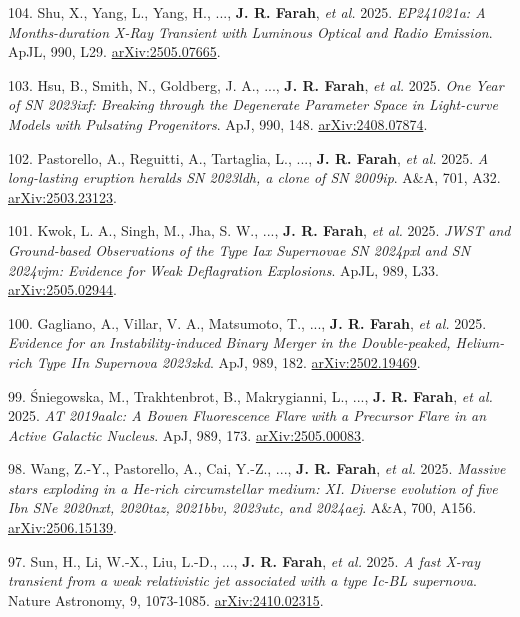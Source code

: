 \documentclass[margin,line]{res}
\newcommand{\apj}{ApJ}                    %
\newcommand{\apjl}{ApJL}                  %
\newcommand{\aap}{A\&A}                   %
\begin{document}
\begin{resume}
104. Shu, X., Yang, L., Yang, H., ..., \textbf{J. R. Farah}, \textit{et al.} 2025. \textit{EP241021a: A Months-duration X-Ray Transient with Luminous Optical and Radio Emission}. \apjl, 990, L29. \href{https://arxiv.org/abs/2505.07665}{arXiv:2505.07665}.

103. Hsu, B., Smith, N., Goldberg, J. A., ..., \textbf{J. R. Farah}, \textit{et al.} 2025. \textit{One Year of SN 2023ixf: Breaking through the Degenerate Parameter Space in Light-curve Models with Pulsating Progenitors}. \apj, 990, 148. \href{https://arxiv.org/abs/2408.07874}{arXiv:2408.07874}.

102. Pastorello, A., Reguitti, A., Tartaglia, L., ..., \textbf{J. R. Farah}, \textit{et al.} 2025. \textit{A long-lasting eruption heralds SN 2023ldh, a clone of SN 2009ip}. \aap, 701, A32. \href{https://arxiv.org/abs/2503.23123}{arXiv:2503.23123}.

101. Kwok, L. A., Singh, M., Jha, S. W., ..., \textbf{J. R. Farah}, \textit{et al.} 2025. \textit{JWST and Ground-based Observations of the Type Iax Supernovae SN 2024pxl and SN 2024vjm: Evidence for Weak Deflagration Explosions}. \apjl, 989, L33. \href{https://arxiv.org/abs/2505.02944}{arXiv:2505.02944}.

100. Gagliano, A., Villar, V. A., Matsumoto, T., ..., \textbf{J. R. Farah}, \textit{et al.} 2025. \textit{Evidence for an Instability-induced Binary Merger in the Double-peaked, Helium-rich Type IIn Supernova 2023zkd}. \apj, 989, 182. \href{https://arxiv.org/abs/2502.19469}{arXiv:2502.19469}.

99. {\'S}niegowska, M., Trakhtenbrot, B., Makrygianni, L., ..., \textbf{J. R. Farah}, \textit{et al.} 2025. \textit{AT 2019aalc: A Bowen Fluorescence Flare with a Precursor Flare in an Active Galactic Nucleus}. \apj, 989, 173. \href{https://arxiv.org/abs/2505.00083}{arXiv:2505.00083}.

98. Wang, Z.-Y., Pastorello, A., Cai, Y.-Z., ..., \textbf{J. R. Farah}, \textit{et al.} 2025. \textit{Massive stars exploding in a He-rich circumstellar medium: XI. Diverse evolution of five Ibn SNe 2020nxt, 2020taz, 2021bbv, 2023utc, and 2024aej}. \aap, 700, A156. \href{https://arxiv.org/abs/2506.15139}{arXiv:2506.15139}.

97. Sun, H., Li, W.-X., Liu, L.-D., ..., \textbf{J. R. Farah}, \textit{et al.} 2025. \textit{A fast X-ray transient from a weak relativistic jet associated with a type Ic-BL supernova}. Nature Astronomy, 9, 1073-1085. \href{https://arxiv.org/abs/2410.02315}{arXiv:2410.02315}.


\end{resume}
\end{document}
